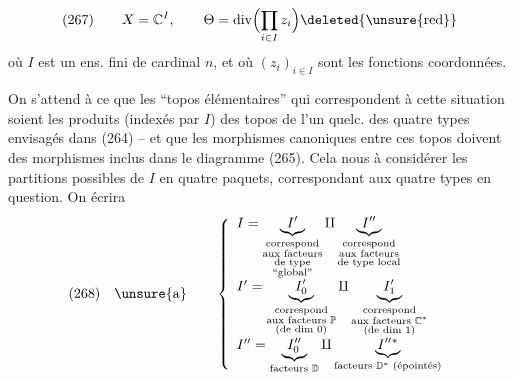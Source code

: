 \[
(267)\qquad X=\mathbb C^I,\qquad \Theta=\operatorname{div}\Bigl(\prod_{i\in I}z_i\Bigr)\deleted{\unsure{\mathrm{red}}}
\]
où $I$ est un ens. fini de cardinal $n$, et où $(z_i)_{i\in I}$ sont les fonctions coordonnées.

On s'attend à ce que les ``topos élémentaires'' qui correspondent à cette situation soient les produits (indexés par $I$) des topos de l'un quelc. des quatre types envisagés dans (264) -- et que les morphismes canoniques entre ces topos doivent  des morphismes inclus dans le diagramme (265). Cela nous  à considérer les partitions possibles de $I$ en quatre paquets, correspondant aux quatre types en question. On écrira
\[
(268)\quad\unsure{\mathrm{a}}\qquad
\left\{\begin{array}{l}
I=\underbrace{I'}_{\substack{\text{correspond}\\\text{aux facteurs}\\\text{de type}\\\text{``global''}}}\amalg
\underbrace{I''}_{\substack{\text{correspond}\\\text{aux facteurs}\\\text{de type local}}}\\[3em]
I'=\underbrace{I'_0}_{\substack{\text{correspond}\\\text{aux facteurs }\mathbb P\\\text{(de dim }0\text{)}}}\amalg
\underbrace{I'_1}_{\substack{\text{correspond}\\\text{aux facteurs }\mathbb C^*\\\text{(de dim }1\text{)}}}\\[3em]
I''=\underbrace{I''_0}_{\text{facteurs }\mathbb D}\amalg
\underbrace{I''{}^*}_{\text{facteurs }\mathbb D^*\text{ (épointés)}}
\end{array}\right.
\]
